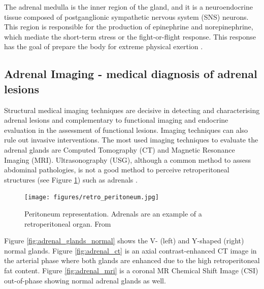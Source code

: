 \documentclass{article}
\begin{document}
The adrenal medulla is the inner region of the gland, and it is a neuroendocrine
tissue composed of postganglionic sympathetic nervous system (SNS) neurons. This
region is responsible for the production of epinephrine and norepinephrine,
which mediate the short-term stress or the fight-or-flight response. This
response has the goal of prepare the body for extreme physical exertion
\cite{open}.

\subsection{Adrenal Imaging - medical diagnosis of adrenal lesions}

Structural medical imaging techniques are decisive in detecting and
characterising adrenal lesions and complementary to functional imaging and
endocrine evaluation in the assessment of functional lesions. Imaging techniques
can also rule out invasive interventions. The most used imaging techniques to
evaluate the adrenal glands are Computed Tomography (CT) and Magnetic Resonance
Imaging (MRI). Ultrasonography (USG), although a common method to assess
abdominal pathologies, is not a good method to perceive retroperitoneal
structures (see Figure \ref{fig:retro_per}) such as adrenals \cite{Panda2015}.

\begin{figure}
    \centering
    \texttt{[image: figures/retro\_peritoneum.jpg]}
    \caption{Peritoneum representation. Adrenals are an example of a retroperitoneal organ. From \cite{retroimg} }
    \label{fig:retro_per}
\end{figure}

Figure \ref{fig:adrenal_glands_normal} shows the V- (left) and Y-shaped (right)
normal glands. Figure \ref{fig:adrenal_ct} is an axial contrast-enhanced CT
image in the arterial phase where both glands are enhanced due to the high
retroperitoneal fat content. Figure \ref{fig:adrenal_mri} is a coronal MR
Chemical Shift Image (CSI) out-of-phase showing normal adrenal glands as well.
\end{document}
